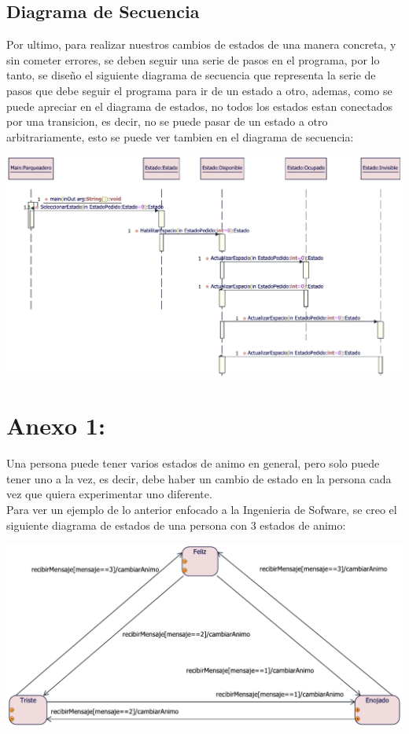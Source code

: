 \newpage
\subsection{Diagrama de Secuencia}
\begin{flushleft}
	Por ultimo, para realizar nuestros cambios de estados de una manera concreta, y sin cometer errores, se deben seguir una serie de pasos en el programa, por lo tanto, se diseño el siguiente diagrama de secuencia que representa la serie de pasos que debe seguir el programa para ir de un estado a otro, ademas, como se puede apreciar en el diagrama de estados, no todos los estados estan conectados por una transicion, es decir, no se puede pasar de un estado a otro arbitrariamente, esto se puede ver tambien en el diagrama de secuencia:
	\begin{center}
		{\includegraphics[width=1.18\linewidth]{imgs/Imagenes - Diagrama de estados/SecuenciaEstados}}\end{center}
\end{flushleft}
\newpage
\section{Anexo 1:}
\begin{flushleft}
	Una persona puede tener varios estados de animo en general, pero solo puede tener uno a la vez, es decir, debe haber un cambio de estado en la persona cada vez que quiera experimentar uno diferente.\\
	Para ver un ejemplo de lo anterior enfocado a la Ingenieria de Sofware, se creo el siguiente diagrama de estados de una persona con 3 estados de animo:
	\begin{center}
		{\includegraphics[width=1.18\linewidth]{imgs/Imagenes - Diagrama de estados/Anexo 1/estadosAnimo}}\end{center}
\end{flushleft}

